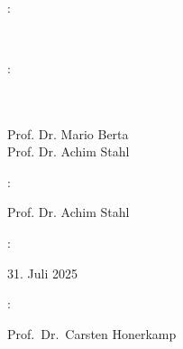 \thispagestyle{empty}

\hfill

\vfill

\textit{\myTitle}\\
\textcopyright \quad {}


\bigskip

\noindent {}: \vspace{-0.5cm}
\begin{flushright}
	\myProf\\
	\myOtherProf
\end{flushright}


:\vspace{-0.5cm}
\begin{flushright}
	\myProf\\
	\myOtherProf\\
	Prof. Dr. Mario Berta\\
	Prof. Dr. Achim Stahl
\end{flushright}

:\vspace{-0.5cm}
\begin{flushright}
	Prof. Dr. Achim Stahl
\end{flushright}

: \vspace{-0.5cm}
\begin{flushright}
	31. Juli 2025
\end{flushright}


:\vspace{-0.5cm}
\begin{flushright}
	Prof.\ Dr.\ Carsten Honerkamp
\end{flushright}



